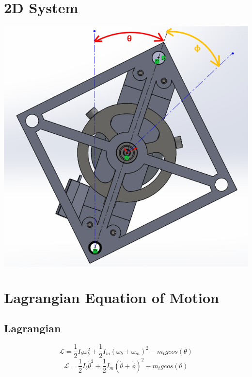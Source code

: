 \documentclass[12pt]{article}
\begin{document}
	\section{2D System}
		\includegraphics[width=\textwidth]{EoM_Image.png}
	\section{Lagrangian Equation of Motion}
		\subsection{Lagrangian}
			\begin{equation}
				\mathcal{L} = \frac{1}{2}I_b\omega_b^2  +  \frac{1}{2}I_m(\omega_b + \omega_m)^2 - m_{t}gcos(\theta)
			\end{equation}
			\begin{equation}
				\mathcal{L} = \frac{1}{2}I_b\dot\theta^2  +  \frac{1}{2}I_m(\dot\theta + \dot\phi)^2 - m_{t}gcos(\theta)
			\end{equation}
\end{document}
